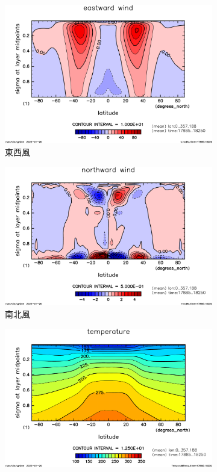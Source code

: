 \documentclass[body]{subfiles}
\begin{document}
\begin{figure}[t]
	\centering
	\begin{subfigure}{.4\textwidth}
		\centering
		\includegraphics[width=\columnwidth]{S1366/U,time=17885:18250-crop-rotate.pdf}
		\caption{東西風}
	\end{subfigure}
	\begin{subfigure}{.4\textwidth}
		\centering
		\includegraphics[width=\columnwidth]{S1366/V,time=17885:18250-crop-rotate.pdf}
		\caption{南北風}
	\end{subfigure}
	\begin{subfigure}{.4\textwidth}
		\centering
		\includegraphics[width=\columnwidth]{S1366/Temp,time=17885:18250-crop-rotate.pdf}

\end{subfigure}
\end{figure}
\end{document}
